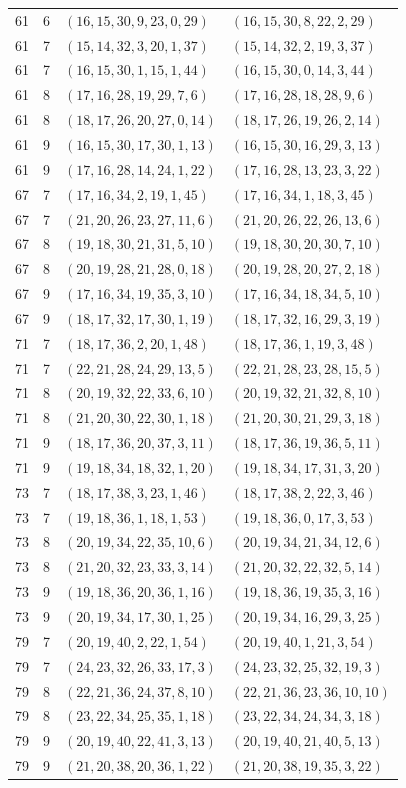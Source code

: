 \documentclass[11pt,a4paper]{article}
\theoremstyle{definition}
\numberwithin{equation}{section}
\begin{document}
\begin{longtable}{rrll}
61&6&$(16,15,30,9,23,0,29)$&$(16,15,30,8,22,2,29)$\\
61&7&$(15,14,32,3,20,1,37)$&$(15,14,32,2,19,3,37)$\\
61&7&$(16,15,30,1,15,1,44)$&$(16,15,30,0,14,3,44)$\\
61&8&$(17,16,28,19,29,7,6)$&$(17,16,28,18,28,9,6)$\\
61&8&$(18,17,26,20,27,0,14)$&$(18,17,26,19,26,2,14)$\\
61&9&$(16,15,30,17,30,1,13)$&$(16,15,30,16,29,3,13)$\\
61&9&$(17,16,28,14,24,1,22)$&$(17,16,28,13,23,3,22)$\\
67&7&$(17,16,34,2,19,1,45)$&$(17,16,34,1,18,3,45)$\\
67&7&$(21,20,26,23,27,11,6)$&$(21,20,26,22,26,13,6)$\\
67&8&$(19,18,30,21,31,5,10)$&$(19,18,30,20,30,7,10)$\\
67&8&$(20,19,28,21,28,0,18)$&$(20,19,28,20,27,2,18)$\\
67&9&$(17,16,34,19,35,3,10)$&$(17,16,34,18,34,5,10)$\\
67&9&$(18,17,32,17,30,1,19)$&$(18,17,32,16,29,3,19)$\\
71&7&$(18,17,36,2,20,1,48)$&$(18,17,36,1,19,3,48)$\\
71&7&$(22,21,28,24,29,13,5)$&$(22,21,28,23,28,15,5)$\\
71&8&$(20,19,32,22,33,6,10)$&$(20,19,32,21,32,8,10)$\\
71&8&$(21,20,30,22,30,1,18)$&$(21,20,30,21,29,3,18)$\\
71&9&$(18,17,36,20,37,3,11)$&$(18,17,36,19,36,5,11)$\\
71&9&$(19,18,34,18,32,1,20)$&$(19,18,34,17,31,3,20)$\\
73&7&$(18,17,38,3,23,1,46)$&$(18,17,38,2,22,3,46)$\\
73&7&$(19,18,36,1,18,1,53)$&$(19,18,36,0,17,3,53)$\\
73&8&$(20,19,34,22,35,10,6)$&$(20,19,34,21,34,12,6)$\\
73&8&$(21,20,32,23,33,3,14)$&$(21,20,32,22,32,5,14)$\\
73&9&$(19,18,36,20,36,1,16)$&$(19,18,36,19,35,3,16)$\\
73&9&$(20,19,34,17,30,1,25)$&$(20,19,34,16,29,3,25)$\\
79&7&$(20,19,40,2,22,1,54)$&$(20,19,40,1,21,3,54)$\\
79&7&$(24,23,32,26,33,17,3)$&$(24,23,32,25,32,19,3)$\\
79&8&$(22,21,36,24,37,8,10)$&$(22,21,36,23,36,10,10)$\\
79&8&$(23,22,34,25,35,1,18)$&$(23,22,34,24,34,3,18)$\\
79&9&$(20,19,40,22,41,3,13)$&$(20,19,40,21,40,5,13)$\\
79&9&$(21,20,38,20,36,1,22)$&$(21,20,38,19,35,3,22)$\\
\bottomrule\end{longtable}\normalsize
\end{document}
